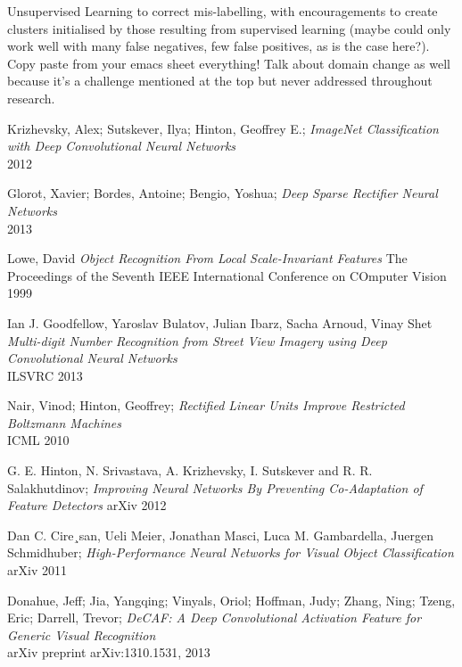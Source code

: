 \documentclass[a4paper,11pt]{article}
\begin{document}
Unsupervised Learning to correct mis-labelling, with encouragements to create clusters initialised by those resulting from supervised learning (maybe could only work well with many false negatives, few false positives, as is the case here?). \\ 

Copy paste from your emacs sheet everything! Talk about domain change as well because it's a challenge mentioned at the top but never addressed throughout research.



\begin{thebibliography}{1}

 Krizhevsky, Alex; Sutskever, Ilya; Hinton, Geoffrey E.;
 \emph{ImageNet Classification with Deep Convolutional Neural Networks}\\
 2012

 Glorot, Xavier; Bordes, Antoine; Bengio, Yoshua;
 \emph{Deep Sparse Rectifier Neural Networks}\\
 2013
 
 Lowe, David
 \emph{Object Recognition From Local Scale-Invariant Features}
 The Proceedings of the Seventh IEEE International Conference on COmputer Vision
 1999 
 
 Ian J. Goodfellow, Yaroslav Bulatov, Julian Ibarz, Sacha Arnoud, Vinay Shet
  \emph{Multi-digit Number Recognition from Street View Imagery using Deep Convolutional Neural Networks}\\
  ILSVRC 2013

 Nair, Vinod; Hinton, Geoffrey;
  \emph{Rectified Linear Units Improve Restricted Boltzmann Machines}\\
  ICML 2010

 G. E. Hinton, N. Srivastava, A. Krizhevsky, I. Sutskever and R. R. Salakhutdinov;
 \emph{Improving Neural Networks By Preventing Co-Adaptation of Feature Detectors}
 arXiv 2012

 Dan C. Cire¸san, Ueli Meier, Jonathan Masci, Luca M. Gambardella, Juergen Schmidhuber;
 \emph{High-Performance Neural Networks for Visual Object Classification}
 arXiv 2011

 Donahue, Jeff; Jia, Yangqing; Vinyals, Oriol; Hoffman, Judy; Zhang, Ning; Tzeng, Eric; Darrell, Trevor;
  \emph{DeCAF: A Deep Convolutional Activation Feature for Generic Visual Recognition}\\
  arXiv preprint arXiv:1310.1531, 2013
  

\end{thebibliography}
\end{document}
